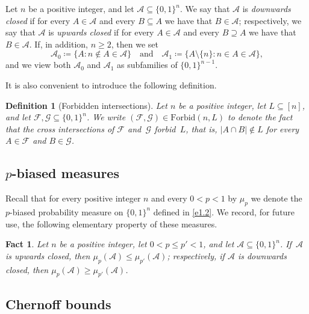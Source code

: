\documentclass[10pt]{amsart}
\newtheorem{fact}[thm]{Fact}
\newtheorem{defn}[thm]{Definition}
\theoremstyle{remark}
\newcommand{\meg}{\geqslant}
\newcommand{\mik}{\leqslant}
\newcommand{\Fcal}{\mathcal{F}}
\newcommand{\Gcal}{\mathcal{G}}
\newcommand{\Acal}{\mathcal{A}}
\begin{document}
Let $n$ be a positive integer, and let $\Acal\subseteq \{0,1\}^n$.
We say that $\Acal$ is \textit{downwards closed} if for every
$A\in\Acal$ and every $B\subseteq A$ we have that $B\in\Acal$; respectively, we say that
$\Acal$ is \textit{upwards closed} if for every $A\in\Acal$ and every $B\supseteq A$
we have that $B\in\Acal$. If, in addition, $n\meg 2$, then we set
\begin{equation} \label{e2.1}
\mathcal{A}_0\coloneqq \{A: n\notin A\in\mathcal{A}\} \ \ \ \text{ and } \ \ \
\mathcal{A}_1\coloneqq \big\{A\setminus \{n\}: n\in A\in\mathcal{A}\big\},
\end{equation}
and we view both $\Acal_0$ and $\Acal_1$ as subfamilies of $\{0,1\}^{n-1}$.

It is also convenient to introduce the following definition.
\begin{defn}[Forbidden intersections] \label{d2.1}
Let $n$ be a positive integer, let $L\subseteq [n]$, and let $\Fcal,\Gcal\subseteq \{0,1\}^n$.
We write $(\Fcal,\Gcal)\in \mathrm{Forbid}(n,L)$ to denote the fact that the cross intersections
of $\Fcal$ and\, $\Gcal$ forbid\, $L$, that is, $|A\cap B|\notin L$ for every $A\in\Fcal$ and $B\in\Gcal$.
\end{defn}

\subsection{$p$-biased measures} \label{subsec2.3}

Recall that for every positive integer $n$ and every $0<p<1$ by $\mu_p$ we
denote the $p$-biased probability measure on $\{0,1\}^n$ defined in \eqref{e1.2}.
We record, for future use, the following elementary property of these measures.
\begin{fact} \label{f2.2}
Let $n$ be a positive integer, let $0<p\mik p'<1$, and let $\Acal\subseteq \{0,1\}^n$.
If~$\Acal$ is upwards closed, then $\mu_p(\Acal)\mik \mu_{p'}(\Acal)$; respectively,
if $\Acal$ is downwards closed, then $\mu_p(\Acal) \meg \mu_{p'}(\Acal)$.
\end{fact}

\subsection{Chernoff bounds} \label{subsec2.4}
\end{document}
